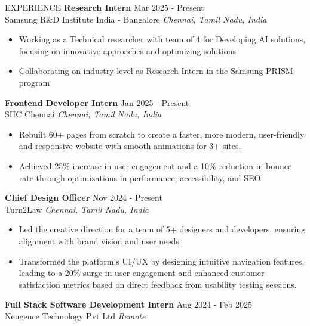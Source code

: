 \documentclass{resume} %
\begin{document}






\begin{rSection}{EXPERIENCE}
    \textbf{Research Intern} \hfill Mar 2025 - Present\\
Samsung R\&D Institute India - Bangalore \hfill \textit{Chennai, Tamil Nadu, India}



\begin{itemize}
\itemsep -3pt{}
\item Working as a Technical researcher with team of 4 for Developing AI solutions, focusing on innovative approaches and optimizing solutions
\item Collaborating on industry-level as Research Intern in the Samsung PRISM program
\end{itemize}
\textbf{Frontend Developer Intern} \hfill Jan 2025 - Present\\
SIIC Chennai \hfill \textit{Chennai, Tamil Nadu, India}



\begin{itemize}
\itemsep -3pt{}
\item Rebuilt 60+ pages from scratch to create a faster, more modern, user-friendly and responsive website with smooth animations for 3+ sites.
\item Achieved 25\% increase in user engagement and a 10\% reduction in bounce rate through optimizations in performance, accessibility, and SEO.
\end{itemize}
\textbf{Chief Design Officer} \hfill Nov 2024 - Present\\
Turn2Law \hfill \textit{Chennai, Tamil Nadu, India}



\begin{itemize}
\itemsep -3pt{}
\item Led the creative direction for a team of 5+ designers and developers, ensuring alignment with brand vision and user needs.
\item Transformed the platform’s UI/UX by designing intuitive navigation features, leading to a 20\% surge in user engagement and enhanced customer satisfaction metrics based on direct feedback from usability testing sessions.
\end{itemize}
\textbf{Full Stack Software Development Intern} \hfill Aug 2024 - Feb 2025\\
Neugence Technology Pvt Ltd \hfill \textit{Remote}




\end{rSection}
\end{document}
